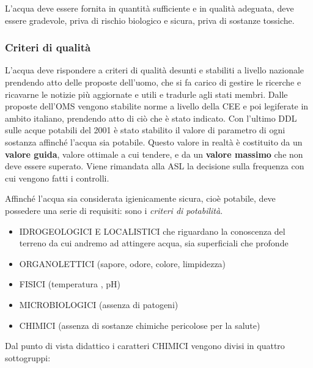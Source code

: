L'acqua deve essere fornita in quantità sufficiente e in qualità
adeguata, deve essere gradevole, priva di rischio biologico e sicura,
priva di sostanze tossiche.

\subsubsection{Criteri di qualità}

L'acqua deve rispondere a criteri di qualità desunti e stabiliti a
livello nazionale prendendo atto delle proposte dell'uomo, che si fa
carico di gestire le ricerche e ricavarne le notizie più aggiornate e
utili e tradurle agli stati membri. Dalle proposte dell'OMS vengono
stabilite norme a livello della CEE e poi legiferate in ambito italiano,
prendendo atto di ciò che è stato indicato. Con l'ultimo DDL sulle acque
potabili del 2001 è stato stabilito il valore di parametro di ogni
sostanza affinché l'acqua sia potabile. Questo valore in realtà è
costituito da un \textbf{valore guida}, valore ottimale a cui tendere, e
da un \textbf{valore massimo} che non deve essere superato. Viene
rimandata alla ASL la decisione sulla frequenza con cui vengono fatti i
controlli.

Affinché l'acqua sia considerata igienicamente sicura, cioè potabile,
deve possedere una serie di requisiti: sono i \emph{criteri di
potabilità}.

\begin{itemize}
\item
  IDROGEOLOGICI E LOCALISTICI che riguardano la conoscenza del terreno
  da cui andremo ad attingere acqua, sia superficiali che profonde
\item
  ORGANOLETTICI (sapore, odore, colore, limpidezza)
\item
  FISICI (temperatura , pH)
\item
  MICROBIOLOGICI (assenza di patogeni)
\item
  CHIMICI (assenza di sostanze chimiche pericolose per la salute)
\end{itemize}

Dal punto di vista didattico i caratteri CHIMICI vengono divisi in
quattro sottogruppi:


